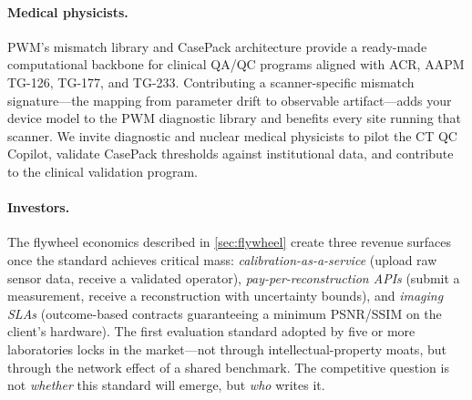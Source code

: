 \paragraph{Medical physicists.}
PWM's mismatch library and CasePack architecture provide a ready-made
computational backbone for clinical QA/QC programs aligned with ACR,
AAPM TG-126, TG-177, and TG-233.  Contributing a scanner-specific
mismatch signature---the mapping from parameter drift to observable
artifact---adds your device model to the PWM diagnostic library and
benefits every site running that scanner.  We invite diagnostic and
nuclear medical physicists to pilot the CT QC Copilot, validate CasePack
thresholds against institutional data, and contribute to the clinical
validation program.

\paragraph{Investors.}
The flywheel economics described in \cref{sec:flywheel} create three
revenue surfaces once the standard achieves critical mass:
\emph{calibration-as-a-service} (upload raw sensor data, receive a
validated operator), \emph{pay-per-reconstruction APIs} (submit a
measurement, receive a reconstruction with uncertainty bounds), and
\emph{imaging SLAs} (outcome-based contracts guaranteeing a minimum
PSNR/SSIM on the client's hardware).  The first evaluation standard
adopted by five or more laboratories locks in the market---not through
intellectual-property moats, but through the network effect of a shared
benchmark.  The competitive question is not \emph{whether} this standard
will emerge, but \emph{who} writes it.
